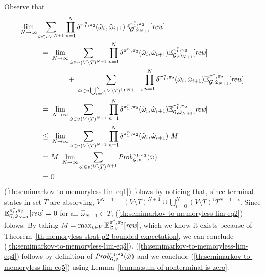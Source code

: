 \begin{myproof}
  Observe that
  \begin{align}
    \lim_{N \rightarrow \infty} \sum_{\hat{\omega} \in vV^{N+1}}\prod^{N}_{n=1}\delta^{\strat{1}^n,\strat{2}}(\hat{\omega}_i,\hat{\omega}_{i+1}) \Expect{\starredstrat{1}}{\strat{2}}_{\StochG, \hat{\omega}_{N+1}}[\Rewards] \hspace{-16em} & \notag \\
    = \ & \lim_{N \rightarrow \infty} \sum_{\hat{\omega} \in v(V\setminus T)^{N+1}}\prod^{N}_{n=1}\delta^{\strat{1}^n,\strat{2}}(\hat{\omega}_i,\hat{\omega}_{i+1}) \Expect{\starredstrat{1}}{\strat{2}}_{\StochG, \hat{\omega}_{N+1}}[\Rewards] \label{th:semimarkov-to-memoryless-lim-eq1}\\
    & \phantom{\lim_{N \rightarrow \infty}} + \
    \sum_{\hat{\omega} \in v\bigcup_{i=0}^N(V\setminus T)^iT^{N+1-i}}\prod^{N}_{n=1}\delta^{\strat{1}^n,\strat{2}}(\hat{\omega}_i,\hat{\omega}_{i+1}) \Expect{\starredstrat{1}}{\strat{2}}_{\StochG, \hat{\omega}_{N+1}}[\Rewards] \notag \\
    = \ & \lim_{N \rightarrow \infty} \sum_{\hat{\omega} \in v(V\setminus T)^{N+1}}\prod^{N}_{n=1}\delta^{\strat{1}^n,\strat{2}}(\hat{\omega}_i,\hat{\omega}_{i+1}) \Expect{\starredstrat{1}}{\strat{2}}_{\StochG, \hat{\omega}_{N+1}}[\Rewards] \label{th:semimarkov-to-memoryless-lim-eq2}\\
    \leq \ & \lim_{N \rightarrow \infty} \sum_{\hat{\omega} \in v(V\setminus T)^{N+1}}\prod^{N}_{n=1}\delta^{\strat{1}^n,\strat{2}}(\hat{\omega}_i,\hat{\omega}_{i+1}) \ M \label{th:semimarkov-to-memoryless-lim-eq3}\\
    = \ & M \ \lim_{N \rightarrow \infty} \sum_{\hat{\omega} \in v(V\setminus T)^{N+1}} \Prob{\strat{1}}{\strat{2}}_{\StochG,v}(\hat{\omega}) \label{th:semimarkov-to-memoryless-lim-eq4}\\
    = \ & 0  \label{th:semimarkov-to-memoryless-lim-eq5}
  \end{align}
  (\ref{th:semimarkov-to-memoryless-lim-eq1}) folows by noticing that,
  since terminal states in set $T$ are absorving,
  $V^{N+1}=(V\setminus T)^{N+1}\cup\bigcup_{i=0}^N(V\setminus T)^iT^{N+1-i}$.
  Since
  $\mathbb{E}^{\pi^*_{1}, \pi_{2}}_{\mathcal{G}, \hat{\omega}_{N+1}}[\textit{rew}]=0$
  for all $\hat{\omega}_{N+1}\in T$, (\ref{th:semimarkov-to-memoryless-lim-eq2})
  folows.
  By taking
  $M = \max_{v\in V} \mathbb{E}^{\pi^*_{1}, \pi_{2}}_{\mathcal{G}, v}[\textit{rew}]$,
  which we know it exists because of
  Theorem~\ref{th:memoryless-strat-p2-bounded-expectation}, we can conclude
  (\ref{th:semimarkov-to-memoryless-lim-eq3}).
  (\ref{th:semimarkov-to-memoryless-lim-eq4}) follows by definition of
  $\mathit{Prob}^{\pi_{1}, \pi_{2}}_{\mathcal{G},v}(\hat{\omega})$ and we
  conclude (\ref{th:semimarkov-to-memoryless-lim-eq5}) using
  Lemma~\ref{lemma:sum-of-nonterminal-is-zero}.
  

\end{myproof}
